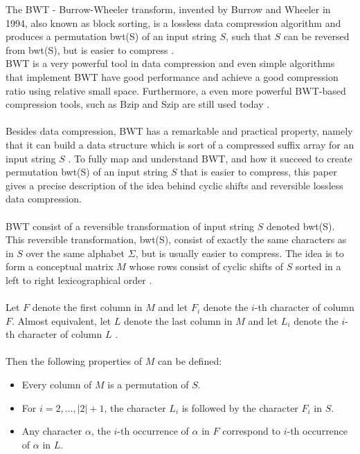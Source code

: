 \documentclass[12pt]{article} %
\begin{document}
The BWT - Burrow-Wheeler transform, invented by Burrow and Wheeler in 1994, also known as block sorting, is a lossless data compression algorithm and produces a permutation bwt(S) of an input string $S$, such that $S$ can be reversed from bwt(S), but is easier to compress \cite{BWT}. \\
BWT is a very powerful tool in data compression and even simple algorithms that implement BWT have good performance and achieve a good compression ratio using relative small space. Furthermore, a even more powerful BWT-based compression tools, such as Bzip and Szip are still used today \cite{BWT}.
\\ \\
Besides data compression, BWT has a remarkable and practical property, namely that it can build a data structure which is sort of a compressed suffix array for an input string $S$ \cite{BWT}. To fully map and understand BWT, and how it succeed to create permutation bwt(S) of an input string $S$ that is easier to compress, this paper gives a precise description of the idea behind cyclic shifts and reversible lossless data compression.
\\ \\
BWT consist of a reversible transformation of input string $S$ denoted bwt(S). This reversible transformation, bwt(S), consist of exactly the same characters as in $S$ over the same alphabet $\Sigma$, but is usually easier to compress. The idea is to form a conceptual matrix $M$ whose rows consist of cyclic shifts of $S$ sorted in a left to right lexicographical order \cite{BWT}.
\\ \\
Let $F$ denote the first column in $M$ and let $F_i$ denote the $i$-th character of column $F$. Almost equivalent, let $L$ denote the last column in $M$ and let $L_i$ denote the $i$-th character of column $L$ \cite{BWT}.
\\ \\
Then the following properties of $M$ can be defined:
\begin{itemize}
  \item Every column of $M$ is a permutation of $S$.
  \item For $i=2, \ldots , |2| + 1$, the character $L_i$ is followed by the character $F_i$ in $S$.
  \item Any character $\alpha$, the $i$-th occurrence of $\alpha$ in $F$ correspond to $i$-th occurrence of $\alpha$ in $L$. 
\end{itemize}
\end{document}
